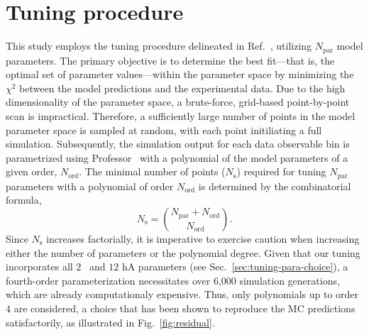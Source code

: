 \section{\label{sec:Tuning}Tuning procedure}
This study employs the tuning procedure delineated in Ref.~\cite{GENIE:2022qrc}, utilizing $N_{\textrm{par}}$ model parameters. 
The primary objective is to determine the best fit—that is, the optimal set of parameter values—within the parameter space by minimizing the $\chi^2$ between the model predictions and the experimental data. 
Due to the high dimensionality of the parameter space, a brute-force, grid-based point-by-point scan is impractical. 
Therefore, a sufficiently large number of points in the model parameter space is sampled at random, with each point initiliating a full simulation. 
Subsequently, the simulation output for each data observable bin is parametrized using Professor~\cite{Buckley:2009bj} with a polynomial of the model parameters of a given order, $N_{\textrm{ord}}$. 
The minimal number of points ($N_{\textrm{s}}$) required for tuning $N_{\textrm{par}}$ parameters with a polynomial of order $N_{\textrm{ord}}$ is determined by the combinatorial formula,
\begin{equation}
    N_{\textrm{s}} = \binom{N_{\textrm{par}}+N_{\textrm{ord}}}{N_{\textrm{ord}}}.
\end{equation}
Since $N_\textrm{s}$ increases factorially, it is imperative to exercise caution when increasing either the number of parameters or the polynomial degree. 
Given that our tuning incorporates all $2$ \sfcfg\ and $12$ hA parameters (see Sec.~\ref{sec:tuning-para-choice}), a fourth-order parameterization necessitates over 6,000 simulation generations, which are already computationaly expensive.
Thus, only polynomials up to order $4$ are considered, a choice that has been shown to reproduce the MC predictions satisfactorily, as illustrated in Fig.~\ref{fig:residual}. 
